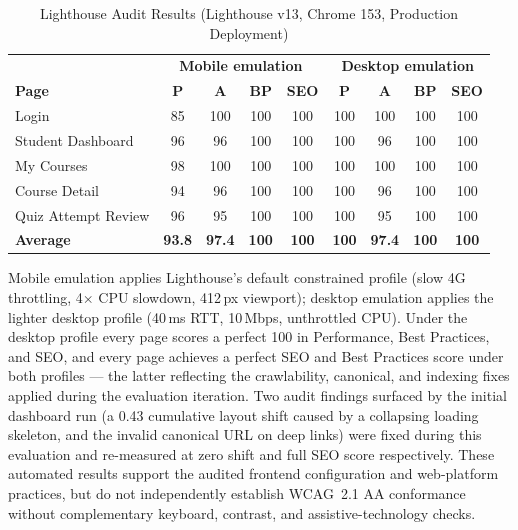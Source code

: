 \begin{table}[htbp]
\centering
\caption{Lighthouse Audit Results (Lighthouse v13, Chrome 153, Production Deployment)}
\label{tab:lighthouse_results}
\renewcommand{\arraystretch}{1.3}
\small
\begin{tabular}{|l|c|c|c|c||c|c|c|c|}
\hline
& \multicolumn{4}{c||}{\textbf{Mobile emulation}} & \multicolumn{4}{c|}{\textbf{Desktop emulation}} \\
\textbf{Page} & \textbf{P} & \textbf{A} & \textbf{BP} & \textbf{SEO} & \textbf{P} & \textbf{A} & \textbf{BP} & \textbf{SEO} \\
\hline
Login                  & 85  & 100 & 100 & 100 & 100 & 100 & 100 & 100 \\
Student Dashboard      & 96  & 96  & 100 & 100 & 100 & 96  & 100 & 100 \\
My Courses             & 98  & 100 & 100 & 100 & 100 & 100 & 100 & 100 \\
Course Detail          & 94  & 96  & 100 & 100 & 100 & 96  & 100 & 100 \\
Quiz Attempt Review    & 96  & 95  & 100 & 100 & 100 & 95  & 100 & 100 \\
\hline
\textbf{Average}       & \textbf{93.8} & \textbf{97.4} & \textbf{100} & \textbf{100} & \textbf{100} & \textbf{97.4} & \textbf{100} & \textbf{100} \\
\hline
\end{tabular}
\end{table}

Mobile emulation applies Lighthouse's default constrained profile (slow 4G throttling, 4$\times$ CPU slowdown, 412\,px viewport); desktop emulation applies the lighter desktop profile (40\,ms RTT, 10\,Mbps, unthrottled CPU). Under the desktop profile every page scores a perfect 100 in Performance, Best Practices, and SEO, and every page achieves a perfect SEO and Best Practices score under both profiles --- the latter reflecting the crawlability, canonical, and indexing fixes applied during the evaluation iteration. Two audit findings surfaced by the initial dashboard run (a 0.43 cumulative layout shift caused by a collapsing loading skeleton, and the invalid canonical URL on deep links) were fixed during this evaluation and re-measured at zero shift and full SEO score respectively. These automated results support the audited frontend configuration and web-platform practices, but do not independently establish WCAG~2.1 AA conformance without complementary keyboard, contrast, and assistive-technology checks.

